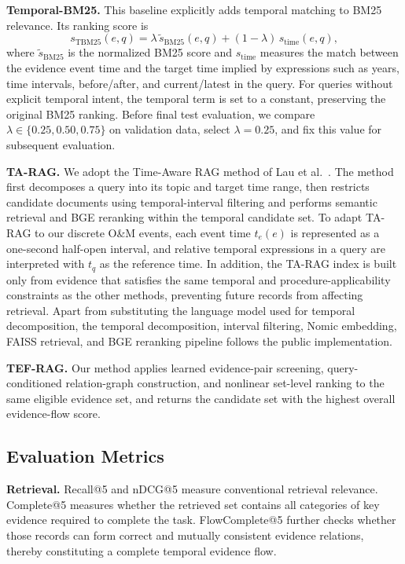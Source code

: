 \textbf{Temporal-BM25.}
This baseline explicitly adds temporal matching to BM25 relevance. Its ranking score is
\begin{equation}
s_{\mathrm{TBM25}}(e,q)
=
\lambda\,\widetilde{s}_{\mathrm{BM25}}(e,q)
+
(1-\lambda)\,s_{\mathrm{time}}(e,q),
\end{equation}
where $\widetilde{s}_{\mathrm{BM25}}$ is the normalized BM25 score and $s_{\mathrm{time}}$ measures the match between the evidence event time and the target time implied by expressions such as years, time intervals, before/after, and current/latest in the query. For queries without explicit temporal intent, the temporal term is set to a constant, preserving the original BM25 ranking. Before final test evaluation, we compare $\lambda\in\{0.25,0.50,0.75\}$ on validation data, select $\lambda=0.25$, and fix this value for subsequent evaluation.

\textbf{TA-RAG.}
We adopt the Time-Aware RAG method of Lau et al.~\cite{lau2025tarag}. The method first decomposes a query into its topic and target time range, then restricts candidate documents using temporal-interval filtering and performs semantic retrieval and BGE reranking within the temporal candidate set. To adapt TA-RAG to our discrete O\&M events, each event time $t_e(e)$ is represented as a one-second half-open interval, and relative temporal expressions in a query are interpreted with $t_q$ as the reference time. In addition, the TA-RAG index is built only from evidence that satisfies the same temporal and procedure-applicability constraints as the other methods, preventing future records from affecting retrieval. 
Apart from substituting the language model used for temporal decomposition, the temporal decomposition, interval filtering, Nomic embedding, FAISS retrieval, and BGE reranking pipeline follows the public implementation.

\textbf{TEF-RAG.}
Our method applies learned evidence-pair screening, query-conditioned relation-graph construction, and nonlinear set-level ranking to the same eligible evidence set, and returns the candidate set with the highest overall evidence-flow score.

\subsection{Evaluation Metrics}
\label{sec:metrics}

\textbf{Retrieval.}
Recall@5 and nDCG@5 measure conventional retrieval relevance. Complete@5 measures whether the retrieved set contains all categories of key evidence required to complete the task. FlowComplete@5 further checks whether those records can form correct and mutually consistent evidence relations, thereby constituting a complete temporal evidence flow.

